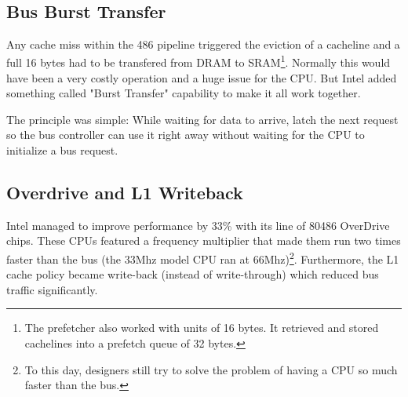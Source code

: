 \par
{}
\par
{}\\
\par




\subsection{Bus Burst Transfer}
Any cache miss within the 486 pipeline triggered the eviction of a cacheline and a full 16 bytes had to be transfered from DRAM to SRAM\footnote{The prefetcher also worked with units of 16 bytes. It retrieved and stored cachelines into a prefetch queue of 32 bytes.}. Normally this would have been a very costly operation and a huge issue for the CPU. But Intel added something called "Burst Transfer" capability to make it all work together.\\
\par
The principle was simple: While waiting for data to arrive, latch the next request so the bus controller can use it right away without waiting for the CPU to initialize a bus request.\\
\par
{}







\subsection{Overdrive and L1 Writeback}
Intel managed to improve performance by 33\% with its line of 80486 OverDrive chips. These CPUs featured a frequency multiplier that made them run two times faster than the bus (the 33Mhz model CPU ran at 66Mhz)\footnote{To this day, designers still try to solve the problem of having a CPU so much faster than the bus.}.  Furthermore, the L1 cache policy became write-back (instead of write-through) which reduced bus traffic significantly.\\
\par 
\vspace{10pt}
\par

